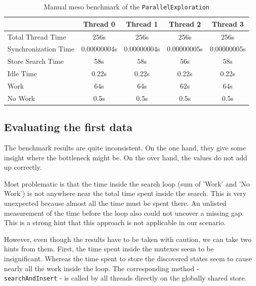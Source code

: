 \begin{center}
    \begin{table}[H]
        \centering
        \begin{tabular}{ | l | c | c | c | c |}
            \hline
            \textbf{} & \textbf{Thread 0} & \textbf{Thread 1} & \textbf{Thread 2} & \textbf{Thread 3}\\ \hline
            Total Thread Time & 256s & 256s & 256s & 256s \\ 
            Synchronization Time & 0.00000004s & 0.00000004s & 0.00000005s & 0.00000005s \\
            Store Search Time & 58s & 58s & 56s & 58s \\ 
            Idle Time & 0.22s & 0.22s & 0.22s & 0.22s \\ 
            Work & 64s & 64s & 62s & 64s \\ 
            No Work & 0.5s & 0.5s & 0.5s & 0.5s \\ \hline
        \end{tabular}
        \caption{Manual meso benchmark of the \texttt{ParallelExploration}}
        \label{ManualBenchmark}
    \end{table}
\end{center}

\subsection{Evaluating the first data}
The benchmark results are quite inconsistent. On the one hand, they give some insight where the bottleneck might be. On the over hand, the values do not add up correctly.

Most problematic is that the time inside the search loop (sum of 'Work' and 'No Work') is not anywhere near the total time spent inside the search. This is very unexpected because almost all the time must be spent there. An unlisted measurement of the time before the loop also could not uncover a missing gap. This is a strong hint that this approach is not applicable in our scenario.

However, even though the results have to be taken with caution, we can take two hints from them. First, the time spent inside the mutexes seem to be insignificant. Whereas the time spent to store the discovered states seem to cause nearly all the work inside the loop. The corresponding method - \texttt{searchAndInsert} - is called by all threads directly on the globally shared store.

